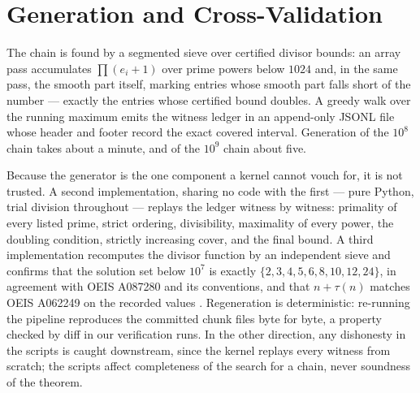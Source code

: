 \documentclass[11pt]{article}
\newcommand{\tdiv}{\tau}
\begin{document}
\section{Generation and Cross-Validation}\label{sec:validation}

The chain is found by a segmented sieve over certified divisor bounds:
an array pass accumulates $\prod (e_i+1)$ over prime powers below
$1024$ and, in the same pass, the smooth part itself, marking entries
whose smooth part falls short of the number --- exactly the entries
whose certified bound doubles. A greedy walk over the running maximum
emits the witness ledger in an append-only JSONL file whose header and
footer record the exact covered interval. Generation of the $10^8$
chain takes about a minute, and of the $10^9$ chain about five.

Because the generator is the one component a kernel cannot vouch for,
it is not trusted. A second implementation, sharing no code with the
first --- pure Python, trial division throughout --- replays the ledger
witness by witness: primality of every listed prime, strict ordering,
divisibility, maximality of every power, the doubling condition,
strictly increasing cover, and the final bound. A third implementation
recomputes the divisor function by an independent sieve and confirms
that the solution set below $10^7$ is exactly
$\{2,3,4,5,6,8,10,12,24\}$, in agreement with OEIS A087280 and its
conventions, and that $n + \tdiv(n)$ matches OEIS A062249 on the
recorded values \cite{oeisA062249}. Regeneration is deterministic:
re-running the pipeline reproduces the committed chunk files byte for
byte, a property checked by diff in our verification runs. In the other
direction, any dishonesty in the scripts is caught downstream, since
the kernel replays every witness from scratch; the scripts affect
completeness of the search for a chain, never soundness of the theorem.
\end{document}
